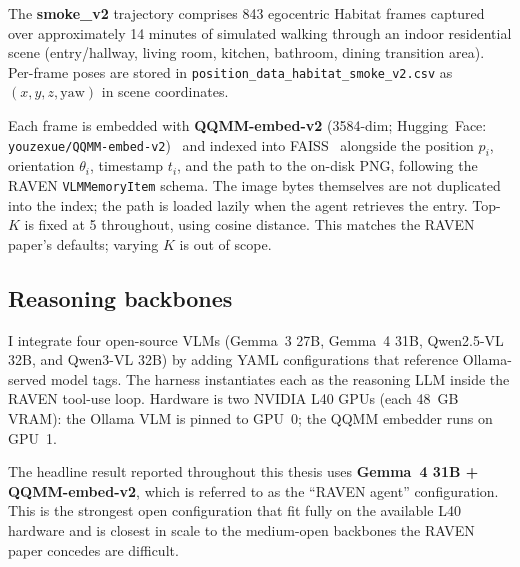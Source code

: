 \documentclass[12pt,letterpaper,oneside]{article}
\begin{document}
The \textbf{smoke\_v2} trajectory comprises 843 egocentric Habitat
frames captured over approximately 14 minutes of simulated walking
through an indoor residential scene (entry/hallway, living room,
kitchen, bathroom, dining transition area).  Per-frame poses are stored in
\texttt{position\_data\_habitat\_smoke\_v2.csv} as $(x, y, z,
\text{yaw})$ in scene coordinates.

Each frame is embedded with \textbf{QQMM-embed-v2} (3584-dim;
Hugging~Face: \texttt{youzexue/QQMM-embed-v2})~\cite{ref:qqmm} and
indexed into FAISS~\cite{ref:faiss} alongside the position
$p_i$, orientation $\theta_i$, timestamp $t_i$, and the path to the
on-disk PNG, following the RAVEN \texttt{VLMMemoryItem} schema.
The image bytes themselves are not duplicated into the index; the
path is loaded lazily when the agent retrieves the entry. Top-$K$
is fixed at 5 throughout, using cosine distance.  This matches the RAVEN paper's defaults;
varying $K$ is out of scope.

\subsection{Reasoning backbones}

I integrate four open-source VLMs (Gemma~3 27B, Gemma~4 31B,
Qwen2.5-VL 32B, and Qwen3-VL 32B) by adding YAML configurations that
reference Ollama-served model tags. The harness instantiates each as
the reasoning LLM inside the RAVEN tool-use loop.  Hardware is two
NVIDIA L40 GPUs (each 48~GB VRAM): the Ollama VLM is pinned to
GPU~0; the QQMM embedder runs on GPU~1.

The headline result reported throughout this thesis uses
\textbf{Gemma~4 31B + QQMM-embed-v2}, which is referred to as the
``RAVEN agent'' configuration.  This is the strongest open
configuration that fit fully on the available L40 hardware and is
closest in scale to the medium-open backbones the RAVEN paper concedes
are difficult.
\end{document}
